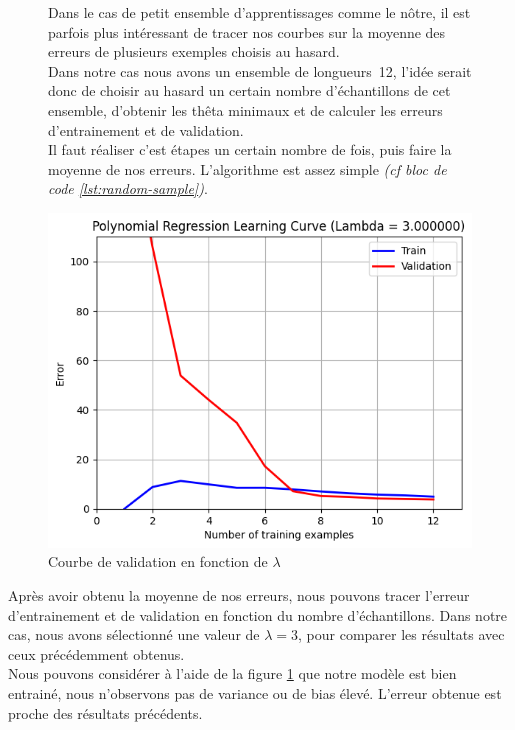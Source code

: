 \begin{figure}[!h]
    \begin{minipage}{.44\linewidth}
        Dans le cas de petit ensemble d'apprentissages comme le nôtre, il est parfois plus intéressant de tracer nos courbes sur la moyenne des erreurs de plusieurs exemples choisis au hasard. \\

        Dans notre cas nous avons un ensemble de longueurs~12, l'idée serait donc de choisir au hasard un certain nombre d'échantillons de cet ensemble, d'obtenir les thêta minimaux et de calculer les erreurs d'entrainement et de validation.\\
        Il faut réaliser c'est étapes un certain nombre de fois, puis faire la moyenne de nos erreurs. L'algorithme est assez simple \textit{(cf bloc de code \ref{lst:random-sample})}. \\


    \end{minipage}\hfill
    \begin{minipage}{.56\linewidth}
        \begin{center}
            \includegraphics[width=.9\textwidth]{./img/5.5.png}
            \caption{\label{fig:validation-curve-poly}Courbe de validation en fonction de $\lambda$}  
        \end{center}
    \end{minipage}
\end{figure}

Après avoir obtenu la moyenne de nos erreurs, nous pouvons tracer l'erreur d'entrainement et de validation en fonction du nombre d'échantillons. Dans notre cas, nous avons sélectionné une valeur de $\lambda = 3$, pour comparer les résultats avec ceux précédemment obtenus. \\
Nous pouvons considérer à l'aide de la figure \ref{fig:validation-curve-poly} que notre modèle est bien entrainé, nous n'observons pas de variance ou de bias élevé. L'erreur obtenue est proche des résultats précédents.



